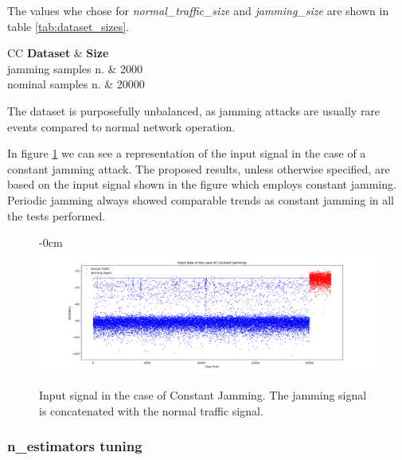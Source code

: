 \documentclass[futureinternet,article,submit,pdftex,moreauthors]{Definitions/mdpi}
\begin{document}
The values whe chose for \textit{normal\_traffic\_size} and \textit{jamming\_size} are shown in table \ref{tab:dataset_sizes}. 

\begin{table}[H]
	\caption{Dataset sizes used for the tuning and testing phases.}\label{tab:dataset_sizes}
	\begin{tabularx}{\textwidth}{CC}
	\toprule
	\textbf{Dataset} & \textbf{Size} \\
	\midrule
	jamming samples n. & 2000 \\
	nominal samples n. & 20000 \\
	\bottomrule
\end{tabularx}
\end{table}

The dataset is purposefully unbalanced, as jamming attacks are usually rare events compared to normal network operation. 

In figure \ref{fig:InputSignal} we can see a representation of the input signal in the case of a constant jamming attack. The proposed results, unless otherwise specified, are based on the input signal shown in the figure which employs constant jamming. Periodic jamming always showed comparable trends as constant jamming in all the tests performed.


\begin{figure}[H]
	\begin{adjustwidth}{-\extralength}{0cm}
	\centering
	\includegraphics[width=19.5cm]{img/InputSignal.png}
	\caption{Input signal in the case of Constant Jamming. The jamming signal is concatenated with the normal traffic signal.}\label{fig:InputSignal}
\end{adjustwidth}
\end{figure}  

\subsubsection{n\_estimators tuning}
\end{document}
